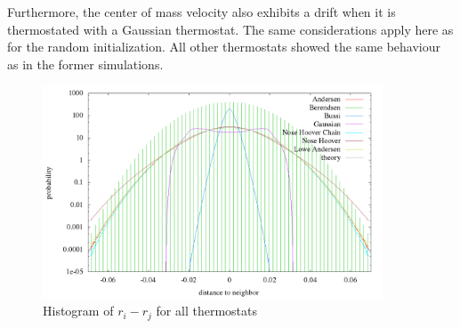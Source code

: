 Furthermore, the center of mass velocity also exhibits a drift when it is thermostated with a Gaussian thermostat. The same considerations apply here as for the random initialization. All other thermostats showed the same behaviour as in the former simulations.     

\begin{figure}[H]
\centering
\includegraphics[width=0.9\textwidth]{./graphics/Histogramm_relPos_one_T=20_p=64.png}
\caption{Histogram of $r_i - r_j$ for all thermostats}
\label{im:relPos_one}
\end{figure} 

